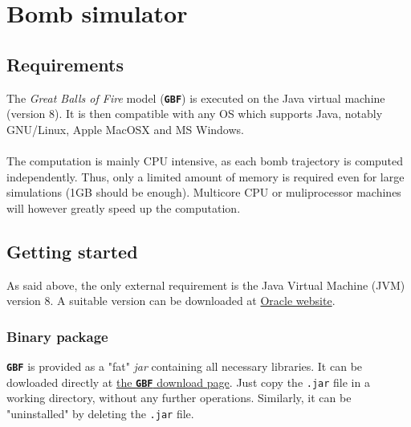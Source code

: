 \documentclass[10pt,a4paper]{article}
\begin{document}
  


\section{Bomb simulator}

\subsection{Requirements}
\label{sec-1}

The \textit{Great Balls of Fire} model (\textbf{\texttt{\textsf{\color{namecolor}GBF}}}) is executed on the Java virtual machine (version 8). It is then
compatible with any OS which supports Java, notably GNU/Linux, Apple
MacOSX and MS Windows.

\paragraph{}	The computation is mainly CPU intensive, as each bomb trajectory is
computed independently. Thus, only a
limited amount of memory is required even for large simulations (1GB
should be enough). Multicore CPU or muliprocessor machines will
however greatly speed up the computation.

\subsection{Getting started}
\label{sec-2}

As said above, the only external requirement is the Java Virtual Machine (JVM) version 8.
A suitable version can be downloaded at \href{http://www.oracle.com/technetwork/java/javase/downloads/index.html}{Oracle website}.

\subsubsection{Binary package}
\label{sec-2-1}

\textbf{\texttt{\textsf{\color{namecolor}GBF}}} is provided as a "fat" \textit{jar} containing all necessary libraries. It can be dowloaded
directly at \href{http://example.com/download}{the \textbf{\texttt{\textsf{\color{namecolor}GBF}}} download page}. Just copy the \texttt{.jar} file in a working directory, without any
further operations. Similarly, it can be "uninstalled" by deleting the
\texttt{.jar} file.
\end{document}
